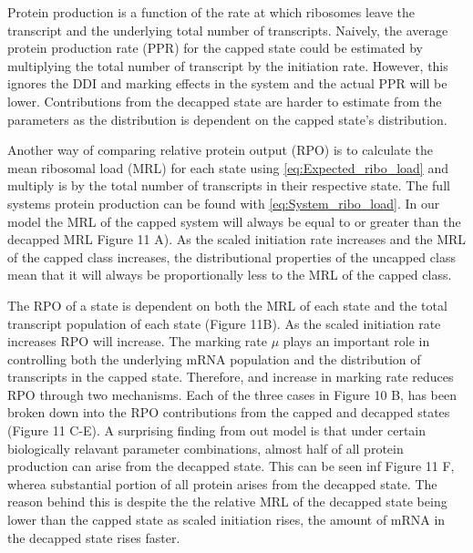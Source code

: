 \documentclass[review]{elsarticle}
\begin{document}
Protein production is a function of the rate at which ribosomes leave the transcript and the underlying total number of transcripts. Naively, the average protein production rate (PPR) for the capped state could be estimated by multiplying the total number of transcript by the initiation rate. However, this ignores the DDI and marking effects in the system and the actual PPR will be lower. Contributions from the decapped state are harder to estimate from the parameters as the distribution is dependent on the capped state's distribution. 

Another way of comparing relative protein output (RPO) is to calculate the mean ribosomal load (MRL) for each state using \ref{eq:Expected_ribo_load} and multiply is by the total number of transcripts in their respective state. The full systems protein production can be found with \ref{eq:System_ribo_load}. In our model the MRL of the capped system will always be equal to or greater than the decapped MRL Figure 11 A). As the scaled initiation rate increases and the MRL of the capped class increases, the distributional properties of the uncapped class mean that it will always be proportionally less to the MRL of the capped class.  

The RPO of a state is dependent on both the MRL of each state and the total transcript population of each state (Figure 11B). As the scaled initiation rate increases RPO will increase. The marking rate $\mu$ plays an important role in controlling both the underlying mRNA population and the distribution of transcripts in the capped state. Therefore, and increase in marking rate reduces RPO through two mechanisms. Each of the three cases in Figure 10 B, has been broken down into the RPO contributions from the capped and decapped states (Figure 11 C-E). A surprising finding from out model is that under certain biologically relavant parameter combinations, almost half of all protein production can arise from the decapped state. This can be seen inf Figure 11 F, wherea substantial portion of all protein arises from the decapped state. The reason behind this is despite the the relative MRL of the decapped state being lower than the capped state as scaled initiation rises, the amount of mRNA in the decapped state rises faster.
\end{document}
